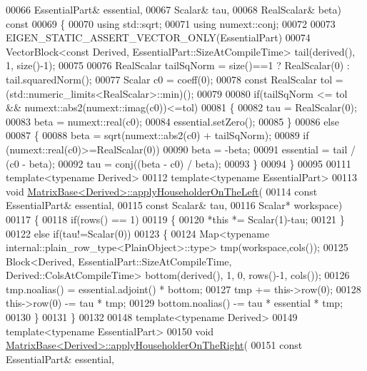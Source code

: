 \begin{DoxyCode}
00066   EssentialPart& essential,
00067   Scalar& tau,
00068   RealScalar& beta)\textcolor{keyword}{ const}
00069 \textcolor{keyword}{}\{
00070   \textcolor{keyword}{using} std::sqrt;
00071   \textcolor{keyword}{using} numext::conj;
00072   
00073   EIGEN\_STATIC\_ASSERT\_VECTOR\_ONLY(EssentialPart)
00074   VectorBlock<const Derived, EssentialPart::SizeAtCompileTime> tail(derived(), 1, size()-1);
00075   
00076   RealScalar tailSqNorm = size()==1 ? RealScalar(0) : tail.squaredNorm();
00077   Scalar c0 = coeff(0);
00078   \textcolor{keyword}{const} RealScalar tol = (std::numeric\_limits<RealScalar>::min)();
00079 
00080   \textcolor{keywordflow}{if}(tailSqNorm <= tol && numext::abs2(numext::imag(c0))<=tol)
00081   \{
00082     tau = RealScalar(0);
00083     beta = numext::real(c0);
00084     essential.setZero();
00085   \}
00086   \textcolor{keywordflow}{else}
00087   \{
00088     beta = sqrt(numext::abs2(c0) + tailSqNorm);
00089     \textcolor{keywordflow}{if} (numext::real(c0)>=RealScalar(0))
00090       beta = -beta;
00091     essential = tail / (c0 - beta);
00092     tau = conj((beta - c0) / beta);
00093   \}
00094 \}
00095 
00111 \textcolor{keyword}{template}<\textcolor{keyword}{typename} Derived>
00112 \textcolor{keyword}{template}<\textcolor{keyword}{typename} EssentialPart>
00113 \textcolor{keywordtype}{void} \hyperlink{group___core___module_a8f2c8059ef3f04cfa0c73b4c012db855}{MatrixBase<Derived>::applyHouseholderOnTheLeft}(
00114   \textcolor{keyword}{const} EssentialPart& essential,
00115   \textcolor{keyword}{const} Scalar& tau,
00116   Scalar* workspace)
00117 \{
00118   \textcolor{keywordflow}{if}(rows() == 1)
00119   \{
00120     *\textcolor{keyword}{this} *= Scalar(1)-tau;
00121   \}
00122   \textcolor{keywordflow}{else} \textcolor{keywordflow}{if}(tau!=Scalar(0))
00123   \{
00124     Map<typename internal::plain\_row\_type<PlainObject>::type> tmp(workspace,cols());
00125     Block<Derived, EssentialPart::SizeAtCompileTime, Derived::ColsAtCompileTime> bottom(derived(), 1, 0, 
      rows()-1, cols());
00126     tmp.noalias() = essential.adjoint() * bottom;
00127     tmp += this->row(0);
00128     this->row(0) -= tau * tmp;
00129     bottom.noalias() -= tau * essential * tmp;
00130   \}
00131 \}
00132 
00148 \textcolor{keyword}{template}<\textcolor{keyword}{typename} Derived>
00149 \textcolor{keyword}{template}<\textcolor{keyword}{typename} EssentialPart>
00150 \textcolor{keywordtype}{void} \hyperlink{group___core___module_ab3e52262b41fa40e194dda245e0f9675}{MatrixBase<Derived>::applyHouseholderOnTheRight}(
00151   \textcolor{keyword}{const} EssentialPart& essential,

\end{DoxyCode}
